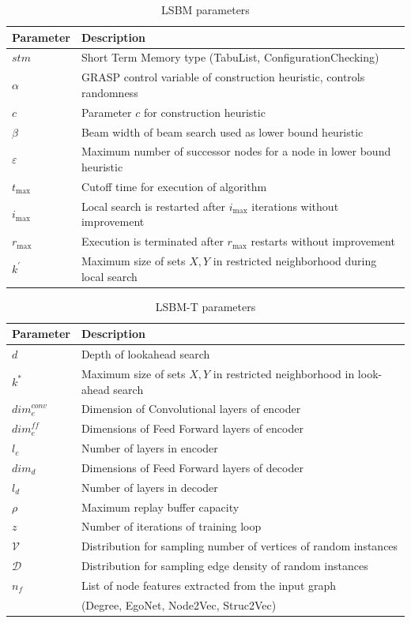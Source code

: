 \documentclass[draft,final]{vutinfth} %
\begin{document}
\begin{table}
    \centering
    \begin{tabular}{ll}
        \hline
        Parameter & Description \\ \hline
        $\mathit{stm}$ & Short Term Memory type (TabuList, ConfigurationChecking) \\
        $\alpha$ & GRASP control variable of construction heuristic, controls randomness \\
        $c$ & Parameter $c$ for construction heuristic \\
        $\beta$ & Beam width of beam search used as lower bound heuristic \\
        $\varepsilon$ & Maximum number of successor nodes for a node in lower bound heuristic \\
        $t_{\max}$ & Cutoff time for execution of algorithm \\
        $i_{\max}$ & Local search is restarted after $i_{\max}$ iterations without improvement \\
        $r_{\max}$ & Execution is terminated after $r_{\max}$ restarts without improvement \\
        $k^\prime$ & Maximum size of sets $X, Y$ in restricted neighborhood during local search 
    \end{tabular}
    \caption{LSBM parameters}
    \label{tab:parameters-lsbm}
\end{table}

\begin{table}
    \centering
    \begin{tabular}{ll}
        \hline
        Parameter & Description \\ \hline
        $d$ & Depth of lookahead search \\
        $k^*$ & Maximum size of sets $X,Y$ in restricted neighborhood in look-ahead search \\
        $\mathit{dim}^{\mathit{conv}}_e$ & Dimension of Convolutional layers of encoder \\
        $\mathit{dim}^{\mathit{ff}}_e$ & Dimensions of Feed Forward layers of encoder \\
        $l_e$ & Number of layers in encoder \\
        $\mathit{dim}_d$ & Dimensions of Feed Forward layers of decoder \\
        $l_d$ & Number of layers in decoder \\
        $\rho$ & Maximum replay buffer capacity \\
        $z$ & Number of iterations of training loop \\
        $\mathcal{V}$ & Distribution for sampling number of vertices of random instances \\
        $\mathcal{D}$ & Distribution for sampling edge density of random instances \\
        $n_f$ & List of node features extracted from the input graph  \\
        & (Degree, EgoNet, Node2Vec, Struc2Vec)
    \end{tabular}
    \caption{LSBM-T parameters}
    \label{tab:parameters-lsbm-t}
\end{table}
\end{document}

